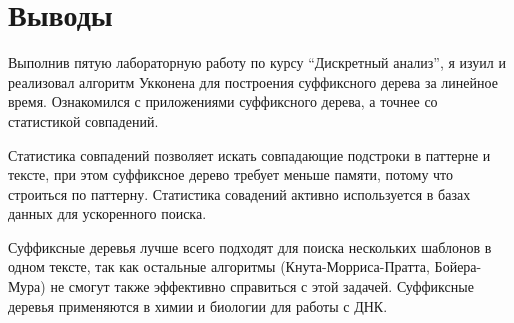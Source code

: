 \section{Выводы}

Выполнив пятую лабораторную работу по курсу \enquote{Дискретный анализ}, 
я изуил и реализовал алгоритм Укконена для построения суффиксного дерева за линейное время. 
Ознакомился с приложениями суффиксного дерева, а точнее со статистикой совпадений.

Статистика совпадений позволяет искать совпадающие подстроки в паттерне и тексте, 
при этом суффиксное дерево требует меньше памяти, потому что строиться по паттерну. 
Статистика совадений активно используется в базах данных для ускоренного поиска.

Суффиксные деревья лучше всего подходят для поиска нескольких шаблонов в одном тексте, 
так как остальные алгоритмы (Кнута-Морриса-Пратта, Бойера-Мура) не смогут также эффективно справиться с этой задачей.
Суффиксные деревья применяются в химии и биологии для работы с ДНК.
\pagebreak